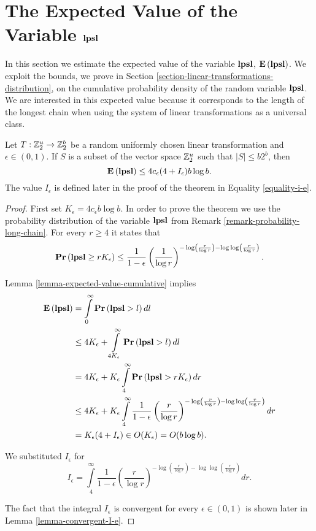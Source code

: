 \section{The Expected Value of the Variable \texorpdfstring{$\mathbf{lpsl}$}{lpsl}}
In this section we estimate the expected value of the variable $\mathbf{lpsl}$, $\mathbf{E}\left(\mathbf{lpsl}\right)$. We exploit the bounds, we prove in Section \ref{section-linear-transformations-distribution}, on the cumulative probability density of the random variable $\mathbf{lpsl}$. We are interested in this expected value because it corresponds to the length of the longest chain when using the system of linear transformations as a universal class.

\begin{theorem}
\label{theorem-n-logn-to-n}
Let $T: \mathbb{Z}_{2}^{u} \rightarrow \mathbb{Z}_{2}^{b}$ be a random uniformly chosen linear transformation and $\epsilon \in (0, 1)$. If $S$ is a subset of the vector space $\mathbb{Z}_{2}^{u}$ such that $|S| \leq b 2 ^ b$, then \[ \mathbf{E}\left(\mathbf{lpsl}\right) \leq 4 c_\epsilon(4 + I_\epsilon) b \log b \text{.} \] The value $I_\epsilon$ is defined later in the proof of the theorem in Equality \ref{equality-i-e}.
\end{theorem}
\begin{proof}
First set $K_\epsilon = 4 c_\epsilon b \log b$. In order to prove the theorem we use the probability distribution of the variable $\mathbf{lpsl}$ from Remark \ref{remark-probability-long-chain}. For every $r \geq 4$ it states that 
\[ 
\mathbf{Pr}\left(\mathbf{lpsl} \geq r K_\epsilon\right) \leq \frac{1}{1 - \epsilon}\left(\frac{1}{\log r}\right) ^ {-\log\left(\frac{r}{\log r}\right) - \log \log \left(\frac{r}{\log r}\right)} \text{.} 
\]

Lemma \ref{lemma-expected-value-cumulative} implies 
\[
\begin{split}
\mathbf{E}\left(\mathbf{lpsl}\right)
	& = \int\limits_0^{\infty} \mathbf{Pr}\left(\mathbf{lpsl} > l\right) dl \\
	& \leq 4K_\epsilon + \int\limits_{4K_\epsilon}^\infty \mathbf{Pr}\left(\mathbf{lpsl} > l\right) dl \\
	& = 4K_\epsilon + K_\epsilon \int\limits_4^\infty \mathbf{Pr}\left(\mathbf{lpsl} > rK_\epsilon\right) dr \\
	& \leq 4K_\epsilon + K_\epsilon \int\limits_4^\infty \frac{1}{1 - \epsilon} \left(\frac{r}{\log r}\right)^{-\log \left(\frac{r}{\log r}\right) - \log \log \left(\frac{r}{\log r}\right)} dr \\
	& = K_\epsilon(4 + I_\epsilon) \in O(K_\epsilon) = O(b \log b) \text{.}
\end{split}
\]

We substituted $I_\epsilon$ for
\begin{equation}
\label{equality-i-e}
I_\epsilon = \int\limits_4^\infty \frac{1}{1 - \epsilon} \left(\frac{r}{\log r}\right)^{-\log \left(\frac{r}{\log r}\right) - \log \log \left(\frac{r}{\log r}\right)} dr \text{.}
\end{equation}

The fact that the integral $I_\epsilon$ is convergent for every $\epsilon \in (0, 1)$ is shown later in Lemma \ref{lemma-convergent-I-e}.
\end{proof}

